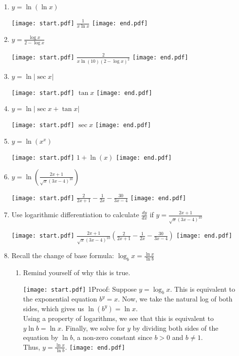 \documentclass[12pt]{article}
\begin{document}
\begin{enumerate}
\item $y = \ln{(\ln x)}$ 

\texttt{[image: start.pdf]}
{{$\frac{1}{x\ln{x}}$}}
\texttt{[image: end.pdf]}


\item $y=\frac{\log{x}}{2-\log{x}}$

\texttt{[image: start.pdf]}
{{$\frac{2}{x\ln{(10)}(2-\log{x})^2}$}}
\texttt{[image: end.pdf]}


\item $y=\ln{|\sec{x}|}$

\texttt{[image: start.pdf]}
{{$\tan{x}$}}
\texttt{[image: end.pdf]}


\item $y=\ln{|\sec{x}+\tan{x}|}$

\texttt{[image: start.pdf]}
{{$\sec{x}$}}
\texttt{[image: end.pdf]}


\item $y=\ln{\left(x^x\right)}$

\texttt{[image: start.pdf]}
{{$1+\ln(x)$}}
\texttt{[image: end.pdf]}


\item $y=\ln{\left(\frac{2x+1}{\sqrt{x}(3x-4)^{10}}\right)}$

\texttt{[image: start.pdf]}
{{$\frac{2}{2x+1}-\frac{1}{2x}-\frac{30}{3x-4}$}}
\texttt{[image: end.pdf]}


\item Use logarithmic differentiation to calculate $\frac{dy}{dx}$ if $y=\frac{2x+1}{\sqrt{x}(3x-4)^{10}}$

\texttt{[image: start.pdf]}
{{$\frac{2x+1}{\sqrt{x}(3x-4)^{10}}\left(\frac{2}{2x+1}-\frac{1}{2x}-\frac{30}{3x-4}\right)$}}
\texttt{[image: end.pdf]}


\item Recall the change of base formula: $\log_{b}{x}=\frac{\ln{x}}{\ln{b}}$

\begin{enumerate}

\item Remind yourself of why this is true.

\texttt{[image: start.pdf]}
{{{1\linewidth}{Proof:  Suppose $y=\log_b{x}$.  This is equivalent to the exponential equation $b^y=x$.  Now, we take the natural log of both sides, which gives us $\ln{(b^y)}=\ln{x}$.\\
Using a property of logarithms, we see that this is equivalent to $y\ln{b}=\ln{x}$.  Finally, we solve for $y$ by dividing both sides of the equation by $\ln{b}$, a non-zero constant since $b>0$ and $b\neq 1$.\\
Thus, $y=\frac{\ln{x}}{\ln{b}}$.}}}
\texttt{[image: end.pdf]}



\end{enumerate}
\end{enumerate}
\end{document}
